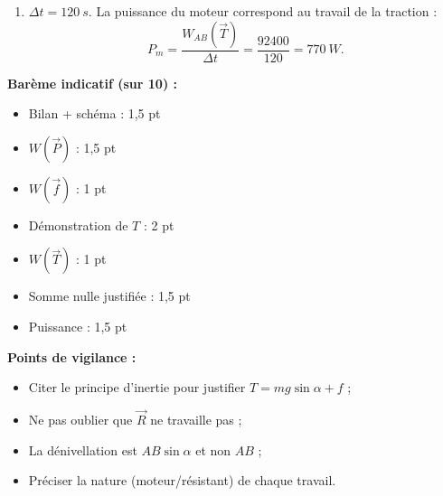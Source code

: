 \documentclass[11pt]{article}
\begin{document}
\begin{corrige}
\begin{enumerate}
\[ \sum W = \num{92400} - \num{68400} - \num{24000} + 0 = \SI{0}{J}. \]
Ce résultat était \textbf{prévisible} : le mouvement est rectiligne et uniforme, donc les forces se compensent ($\sum\vec{F} = \vec{0}$), et la somme de leurs travaux $\left(\sum\vec{F}\right)\cdot\overrightarrow{AB}$ est nulle.
\item $\Delta t = \SI{120}{s}$. La puissance du moteur correspond au travail de la traction :
\[ P_m = \dfrac{W_{AB}(\vec{T})}{\Delta t} = \dfrac{\num{92400}}{120} = \SI{770}{W}. \]
\end{enumerate}
\textbf{Barème indicatif (sur 10) :}
\begin{itemize}
\item Bilan + schéma : 1,5 pt
\item $W(\vec{P})$ : 1,5 pt
\item $W(\vec{f})$ : 1 pt
\item Démonstration de $T$ : 2 pt
\item $W(\vec{T})$ : 1 pt
\item Somme nulle justifiée : 1,5 pt
\item Puissance : 1,5 pt
\end{itemize}
\textbf{Points de vigilance :}
\begin{itemize}
\item Citer le principe d'inertie pour justifier $T = mg\sin\alpha + f$ ;
\item Ne pas oublier que $\vec{R}$ ne travaille pas ;
\item La dénivellation est $AB\sin\alpha$ et non $AB$ ;
\item Préciser la nature (moteur/résistant) de chaque travail.
\end{itemize}
\end{corrige}
\end{document}
